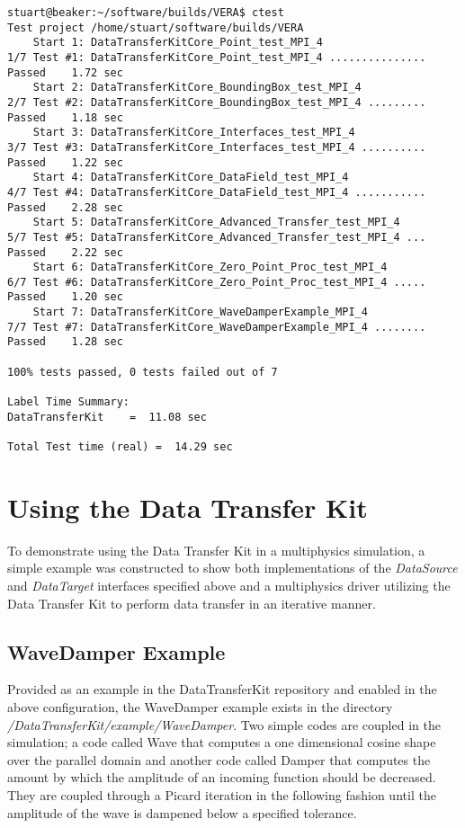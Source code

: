 \documentclass[letterpaper]{article}
\begin{document}
\begin{verbatim}
stuart@beaker:~/software/builds/VERA$ ctest
Test project /home/stuart/software/builds/VERA
    Start 1: DataTransferKitCore_Point_test_MPI_4
1/7 Test #1: DataTransferKitCore_Point_test_MPI_4 ...............   Passed    1.72 sec
    Start 2: DataTransferKitCore_BoundingBox_test_MPI_4
2/7 Test #2: DataTransferKitCore_BoundingBox_test_MPI_4 .........   Passed    1.18 sec
    Start 3: DataTransferKitCore_Interfaces_test_MPI_4
3/7 Test #3: DataTransferKitCore_Interfaces_test_MPI_4 ..........   Passed    1.22 sec
    Start 4: DataTransferKitCore_DataField_test_MPI_4
4/7 Test #4: DataTransferKitCore_DataField_test_MPI_4 ...........   Passed    2.28 sec
    Start 5: DataTransferKitCore_Advanced_Transfer_test_MPI_4
5/7 Test #5: DataTransferKitCore_Advanced_Transfer_test_MPI_4 ...   Passed    2.22 sec
    Start 6: DataTransferKitCore_Zero_Point_Proc_test_MPI_4
6/7 Test #6: DataTransferKitCore_Zero_Point_Proc_test_MPI_4 .....   Passed    1.20 sec
    Start 7: DataTransferKitCore_WaveDamperExample_MPI_4
7/7 Test #7: DataTransferKitCore_WaveDamperExample_MPI_4 ........   Passed    1.28 sec

100% tests passed, 0 tests failed out of 7

Label Time Summary:
DataTransferKit    =  11.08 sec

Total Test time (real) =  14.29 sec
\end{verbatim}

\section{Using the Data Transfer Kit}
To demonstrate using the Data Transfer Kit in a multiphysics
simulation, a simple example was constructed to show both
implementations of the {\sl DataSource} and {\sl DataTarget}
interfaces specified above and a multiphysics driver utilizing the
Data Transfer Kit to perform data transfer in an iterative manner. 

\subsection{WaveDamper Example}
Provided as an example in the DataTransferKit repository and enabled in the
above configuration, the WaveDamper example exists in the directory
{\sl /DataTransferKit/example/WaveDamper}. Two simple codes are coupled in the
simulation; a code called Wave that computes a one dimensional cosine
shape over the parallel domain and another code called Damper that
computes the amount by which the amplitude of an incoming function
should be decreased. They are coupled through a Picard iteration in
the following fashion until the amplitude of the wave is dampened
below a specified tolerance.
\end{document}
